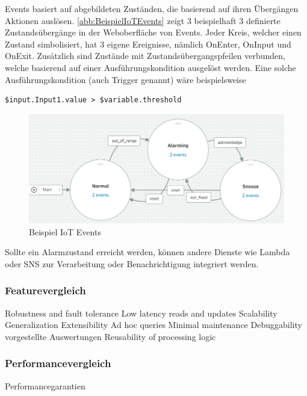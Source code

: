\AWSIOT Events basiert auf abgebildeten Zuständen, die basierend auf ihren Übergängen Aktionen auslösen. \autoref{abb:BeispielIoTEvents} zeigt 3 beispielhaft 3 definierte Zustandsübergänge in der Weboberfläche von \AWSIOT Events. Jeder Kreis, welcher einen Zustand simbolisiert, hat 3 eigene Ereignisse, nämlich OnEnter, OnInput und OnExit. Zusätzlich sind Zustände mit Zustandsübergangspfeilen verbunden, welche basierend auf einer Ausführungskondition ausgelöst werden. Eine solche Ausführungskondition (auch Trigger genannt) wäre beispielsweise
\begin{lstlisting}
$input.Input1.value > $variable.threshold
\end{lstlisting}
\begin{figure}[H]
\centering
\includegraphics[width=\textwidth]{graphics/IoT-Events-Demo.png}
\caption{Beispiel IoT Events}
\label{abb:BeispielIoTEvents}
\end{figure}
Sollte ein Alarmzustand erreicht werden, können andere Dienste wie Lambda oder \ac{SNS} zur Verarbeitung oder Benachrichtigung integriert werden.

\subsubsection{Featurevergleich} 
Robustness and fault tolerance
Low latency reads and updates
Scalability
Generalization
Extensibility
Ad hoc queries
Minimal maintenance
Debuggability
vorgestellte Auswertungen 
Reusability of processing logic

\subsubsection{Performancevergleich}
Performancegarantien

